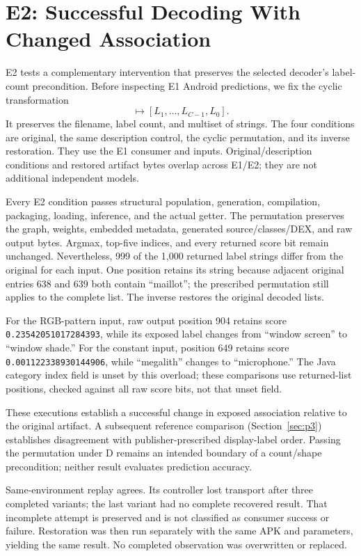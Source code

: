 \documentclass[10pt,twocolumn,letterpaper]{article}
\newcommand{\code}[1]{\texttt{#1}}
\begin{document}
\section{E2: Successful Decoding With Changed Association}
\label{sec:e2}
E2 tests a complementary intervention that preserves the selected decoder's label-count precondition. Before inspecting E1 Android predictions, we fix the cyclic transformation
\begin{equation}
[L_0,L_1,\ldots,L_{C-1}]\mapsto[L_1,\ldots,L_{C-1},L_0].
\end{equation}
It preserves the filename, label count, and multiset of strings. The four conditions are original, the same description control, the cyclic permutation, and its inverse restoration. They use the E1 consumer and inputs. Original/description conditions and restored artifact bytes overlap across E1/E2; they are not additional independent models.

Every E2 condition passes structural population, generation, compilation, packaging, loading, inference, and the actual getter. The permutation preserves the graph, weights, embedded metadata, generated source/classes/DEX, and raw output bytes. Argmax, top-five indices, and every returned score bit remain unchanged. Nevertheless, 999 of the 1,000 returned label strings differ from the original for each input. One position retains its string because adjacent original entries 638 and 639 both contain ``maillot''; the prescribed permutation still applies to the complete list. The inverse restores the original decoded lists.

For the RGB-pattern input, raw output position 904 retains score \code{0.23542051017284393}, while its exposed label changes from ``window screen'' to ``window shade.'' For the constant input, position 649 retains score \code{0.001122338930144906}, while ``megalith'' changes to ``microphone.'' The Java category index field is unset by this overload; these comparisons use returned-list positions, checked against all raw score bits, not that unset field.

These executions establish a successful change in exposed association relative to the original artifact. A subsequent reference comparison (Section~\ref{sec:p3}) establishes disagreement with publisher-prescribed display-label order. Passing the permutation under D remains an intended boundary of a count/shape precondition; neither result evaluates prediction accuracy.

Same-environment replay agrees. Its controller lost transport after three completed variants; the last variant had no complete recovered result. That incomplete attempt is preserved and is not classified as consumer success or failure. Restoration was then run separately with the same APK and parameters, yielding the same result. No completed observation was overwritten or replaced.
\end{document}
